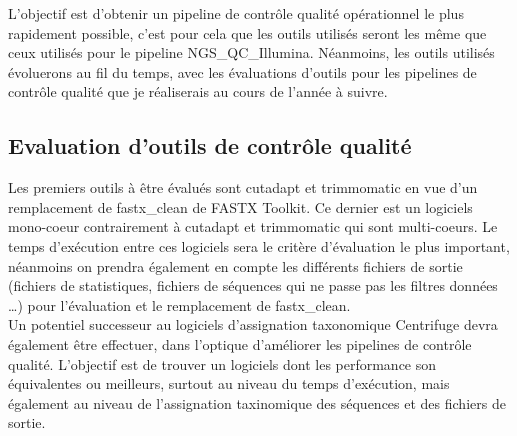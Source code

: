 L'objectif est d'obtenir un pipeline de contrôle qualité opérationnel le plus rapidement possible, c'est pour cela que les outils utilisés seront les même que ceux utilisés pour le pipeline NGS\_QC\_Illumina. Néanmoins, les outils utilisés évoluerons au fil du temps, avec les évaluations d'outils pour les pipelines de contrôle qualité que je réaliserais au cours de l'année à suivre.

\subsection{Evaluation d'outils de contrôle qualité}
Les premiers outils à être évalués sont cutadapt et trimmomatic en vue d'un remplacement de fastx\_clean de FASTX Toolkit. Ce dernier est un logiciels mono-coeur contrairement à cutadapt et trimmomatic qui sont multi-coeurs. Le temps d'exécution entre ces logiciels sera le critère d'évaluation le plus important, néanmoins on prendra également en compte les différents fichiers de sortie (fichiers de statistiques, fichiers de séquences qui ne passe pas les filtres données \dots) pour l'évaluation et le remplacement de fastx\_clean.\\

Un potentiel successeur au logiciels d'assignation taxonomique Centrifuge devra également être effectuer, dans l'optique d'améliorer les pipelines de contrôle qualité. L'objectif est de trouver un logiciels dont les performance son équivalentes ou meilleurs, surtout au niveau du temps d'exécution, mais également au niveau de l'assignation taxinomique des séquences et des fichiers de sortie.